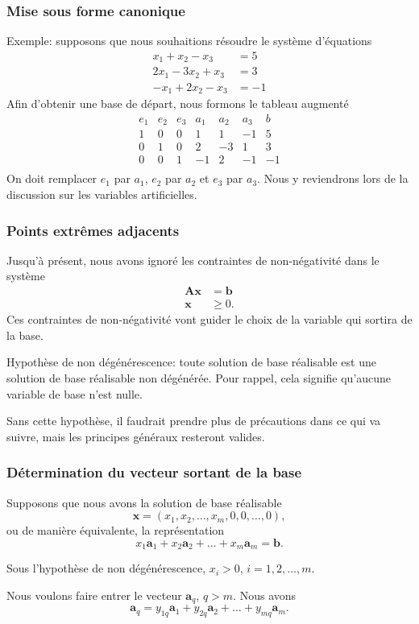 \documentclass[t,usepdftitle=false]{beamer}
\def\ba{\boldsymbol{a}}
\def\bb{\boldsymbol{b}}
\def\bx{\boldsymbol{x}}
\def\bA{\boldsymbol{A}}
\begin{document}
\begin{frame}
\frametitle{Mise sous forme canonique}

Exemple: supposons que nous souhaitions résoudre le système d'équations
\begin{align*}
x_1 + x_2 - x_3 &= 5 \\
2x_1 - 3x_2 + x_3 &= 3 \\
-x_1 + 2x_2 - x_3 &= -1
\end{align*}
Afin d'obtenir une base de départ, nous formons le tableau augmenté
\[
\begin{matrix}
e_1 & e_2 & e_3 & a_1 & a_2 & a_3 & b \\
1 & 0 & 0 & 1 & 1 & -1 & 5 \\
0 & 1 & 0 & 2 & -3 & 1 & 3 \\
0 & 0 & 1 & -1 & 2 & -1 & -1 \\
\end{matrix}
\]
On doit remplacer $e_1$ par $a_1$, $e_2$ par $a_2$ et $e_3$ par $a_3$. Nous y reviendrons lors de la discussion sur les variables artificielles.

\end{frame}

\begin{frame}
\frametitle{Points extrêmes adjacents}

Jusqu'à présent, nous avons ignoré les contraintes de non-négativité dans le système
\begin{align*}
\bA \bx  &= \bb\\
\bx & \ge 0.
\end{align*}
Ces contraintes de non-négativité vont guider le choix de la variable qui sortira de la base.

\mbox{}

{\color{red}Hypothèse de non dégénérescence}:
toute solution de base réalisable est une solution de base réalisable non dégénérée. Pour rappel, cela signifie qu'aucune variable de base n'est nulle.

\mbox{}

Sans cette hypothèse, il faudrait prendre plus de précautions dans ce qui va suivre, mais les principes généraux resteront valides.

\end{frame}

\begin{frame}
\frametitle{Détermination du vecteur sortant de la base}

Supposons que nous avons la solution de base réalisable
\[
\bx = (x_1, x_2,\ldots, x_m, 0, 0, \ldots, 0),
\]
ou de manière équivalente, la représentation
\[
x_1 \ba_1 + x_2 \ba_2 + \ldots + x_m \ba_m = \bb.
\]

\mbox{}

Sous l'hypothèse de non dégénérescence, $x_i > 0$, $i = 1, 2,\ldots, m$.

\mbox{}

Nous voulons faire entrer le vecteur $\ba_q$, $q > m$. Nous avons
\[
\ba_q = y_{1q} \ba_1 + y_{2q}\ba_2 + \ldots + y_{mq} \ba_m.
\]

\end{frame}
\end{document}
